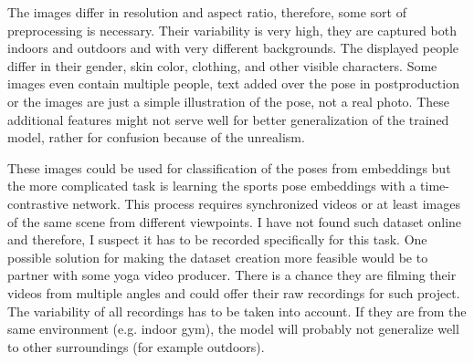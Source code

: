 The images differ in resolution and aspect ratio, therefore, some sort of preprocessing is necessary. Their variability is very high, they are captured both indoors and outdoors and with very different backgrounds. The displayed people differ in their gender, skin color, clothing, and other visible characters. Some images even contain multiple people, text added over the pose in postproduction or the images are just a simple illustration of the pose, not a real photo. These additional features might not serve well for better generalization of the trained model, rather for confusion because of the unrealism.

These images could be used for classification of the poses from embeddings but the more complicated task is learning the sports pose embeddings with a time-contrastive network. This process requires synchronized videos or at least images of the same scene from different viewpoints. I have not found such dataset online and therefore, I suspect it has to be recorded specifically for this task. One possible solution for making the dataset creation more feasible would be to partner with some yoga video producer. There is a chance they are filming their videos from multiple angles and could offer their raw recordings for such project. The variability of all recordings has to be taken into account. If they are from the same environment (e.g. indoor gym), the model will probably not generalize well to other surroundings (for example outdoors).
